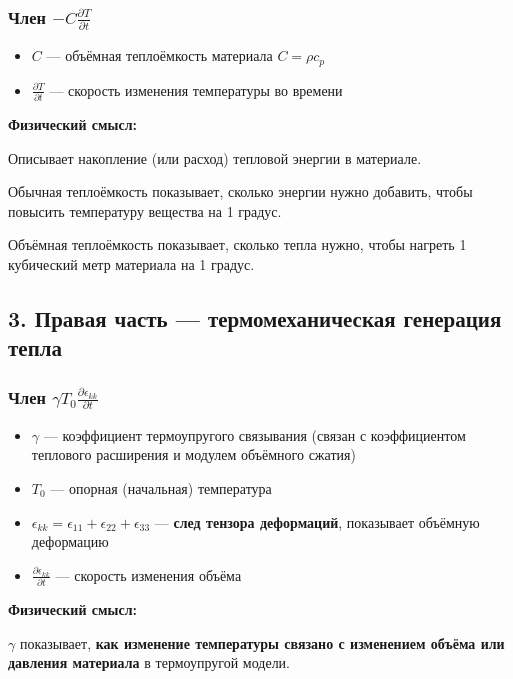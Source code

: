 \subsubsection{Член \(- C \frac{\partial T}{\partial t}\)}

\begin{itemize}
    \item \(C\) — объёмная теплоёмкость материала \(C = \rho c_p\)
    \item \(\frac{\partial T}{\partial t}\) — скорость изменения температуры во времени
\end{itemize}

\textbf{Физический смысл:}  

Описывает накопление (или расход) тепловой энергии в материале.  

Обычная теплоёмкость показывает, сколько энергии нужно добавить, чтобы повысить температуру вещества на 1 градус.  

Объёмная теплоёмкость показывает, сколько тепла нужно, чтобы нагреть 1 кубический метр материала на 1 градус.

\subsection{3. Правая часть — термомеханическая генерация тепла}

\subsubsection{Член \( \gamma T_0 \frac{\partial \epsilon_{kk}}{\partial t} \)}

\begin{itemize}
    \item \(\gamma\) — коэффициент термоупругого связывания (связан с коэффициентом теплового расширения и модулем объёмного сжатия)
    \item \(T_0\) — опорная (начальная) температура
    \item \(\epsilon_{kk} = \epsilon_{11} + \epsilon_{22} + \epsilon_{33}\) — \textbf{след тензора деформаций}, показывает объёмную деформацию
    \item \(\frac{\partial \epsilon_{kk}}{\partial t}\) — скорость изменения объёма
\end{itemize}

\textbf{Физический смысл:}  

\(\gamma\) показывает, \textbf{как изменение температуры связано с изменением объёма или давления материала} в термоупругой модели.  

